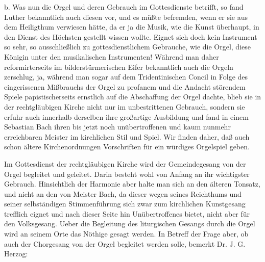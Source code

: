 b. Was nun die Orgel und deren Gebrauch im Gottesdienste betrifft, so fand Luther bekanntlich auch diesen vor, und es müßte befremden, wenn er sie aus dem Heiligthum verwiesen hätte, da er ja die Musik, wie die Kunst überhaupt, in den Dienst des Höchsten gestellt wissen wollte. Eignet sich doch kein Instrument so sehr, so ausschließlich zu gottesdienstlichem Gebrauche, wie die Orgel, diese Königin unter den musikalischen Instrumenten! Während man daher reformirterseits im bilderstürmerischen Eifer bekanntlich auch die Orgeln zerschlug, ja, während man sogar auf dem Tridentinischen Concil in Folge des
eingerissenen Mißbrauchs der Orgel zu profanem und die Andacht störendem Spiele papistischerseits ernstlich auf die Abschaffung der Orgel dachte, blieb sie in der rechtgläubigen Kirche nicht nur im unbestrittenen Gebrauch, sondern sie erfuhr auch innerhalb derselben ihre großartige Ausbildung und fand in einem Sebastian Bach ihren bis jetzt noch unübertroffenen und kaum nunmehr erreichbaren Meister im kirchlichen Stil und Spiel. Wir finden daher, daß auch schon ältere Kirchenordnungen Vorschriften für ein würdiges Orgelspiel geben.

Im Gottesdienst der rechtgläubigen Kirche wird der Gemeindegesang von der Orgel begleitet und geleitet. Darin besteht wohl von Anfang an ihr wichtigster Gebrauch. Hinsichtlich der Harmonie aber halte man sich an den älteren Tonsatz, und nicht an den von Meister Bach, da dieser wegen seines Reichthums und seiner selbständigen Stimmenführung sich zwar zum kirchlichen Kunstgesang trefflich eignet und nach dieser Seite hin Unübertroffenes bietet, nicht aber für den Volksgesang. Ueber die Begleitung des liturgischen Gesangs durch die Orgel wird an seinem Orte das Nöthige gesagt werden. In Betreff der Frage aber, ob auch der Chorgesang von der Orgel begleitet werden solle, bemerkt Dr. J. G. Herzog:

